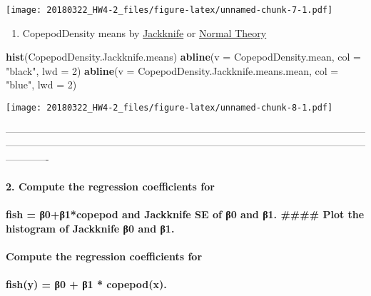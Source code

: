 \documentclass[]{article}
\newenvironment{Shaded}{\begin{snugshade}}{\end{snugshade}}
\newcommand{\KeywordTok}[1]{\textcolor[rgb]{0.13,0.29,0.53}{\textbf{{#1}}}}
\newcommand{\DataTypeTok}[1]{\textcolor[rgb]{0.13,0.29,0.53}{{#1}}}
\newcommand{\DecValTok}[1]{\textcolor[rgb]{0.00,0.00,0.81}{{#1}}}
\newcommand{\StringTok}[1]{\textcolor[rgb]{0.31,0.60,0.02}{{#1}}}
\newcommand{\NormalTok}[1]{{#1}}
\providecommand{\tightlist}{%
  \setlength{\itemsep}{0pt}\setlength{\parskip}{0pt}}
\let\oldparagraph\paragraph
\renewcommand{\paragraph}[1]{\oldparagraph{#1}\mbox{}}
\begin{document}
\texttt{[image: 20180322\_HW4-2\_files/figure-latex/unnamed-chunk-7-1.pdf]}

\begin{enumerate}
\def\labelenumi{(\arabic{enumi})}
\setcounter{enumi}{1}
\tightlist
\item
  CopepodDensity means by \href{blue}{Jackknife} or \href{black}{Normal
  Theory}
\end{enumerate}

\begin{Shaded}
\begin{Highlighting}[]
\KeywordTok{hist}\NormalTok{(CopepodDensity.Jackknife.means)}
\KeywordTok{abline}\NormalTok{(}\DataTypeTok{v =} \NormalTok{CopepodDensity.mean, }\DataTypeTok{col =} \StringTok{"black"}\NormalTok{, }\DataTypeTok{lwd =} \DecValTok{2}\NormalTok{)}
\KeywordTok{abline}\NormalTok{(}\DataTypeTok{v =} \NormalTok{CopepodDensity.Jackknife.means.mean, }\DataTypeTok{col =} \StringTok{"blue"}\NormalTok{, }\DataTypeTok{lwd =} \DecValTok{2}\NormalTok{)}
\end{Highlighting}
\end{Shaded}

\texttt{[image: 20180322\_HW4-2\_files/figure-latex/unnamed-chunk-8-1.pdf]}

-------------------------------------------------------------------------------------------------------------------------------------------------------------------------------------------------------------------------------------

\paragraph{2. Compute the regression coefficients
for}\label{compute-the-regression-coefficients-for}

\paragraph{fish = β0+β1*copepod and Jackknife SE of β0 and β1. \#\#\#\#
Plot the histogram of Jackknife β0 and
β1.}\label{fish-01copepod-and-jackknife-se-of-0-and-1.-plot-the-histogram-of-jackknife-0-and-1.}

\paragraph{Compute the regression coefficients
for}\label{compute-the-regression-coefficients-for-1}

\paragraph{fish(y) = β0 + β1 * copepod(x).}\label{fishy-0-1-copepodx.}
\end{document}
